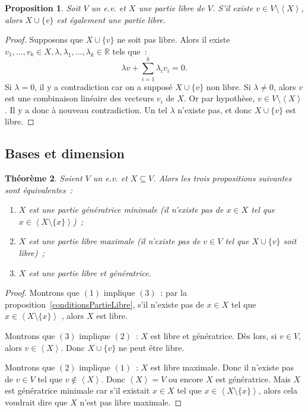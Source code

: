 \documentclass{article}
\newcommand{\R}{\mathbb R}
\newcommand{\eng}[1]{\left\langle#1\right\rangle}
\newtheorem{thm}{Théorème}[section]
\newtheorem{prp}[thm]{Proposition}
\theoremstyle{definition}
\theoremstyle{remark}
\begin{document}
		\begin{prp}\label{ajoutPartieLibre} Soit $V$ un e.v. et $X$ une partie libre de $V$. S'il existe $v \in V \setminus \eng X$, alors $X \cup \{v\}$ est
		également une partie libre. \end{prp}

		\begin{proof} Supposons que $X \cup \{v\}$ ne soit pas libre. Alors il existe $v_1, \dotsc, v_k \in X, \lambda, \lambda_1, \dotsc, \lambda_k \in \R$ tels que~:
		\[\lambda v + \sum_{i=1}^k\lambda_iv_i = 0.\] Si $\lambda = 0$, il y a contradiction car on a supposé $X \cup \{v\}$ non libre. Si $\lambda \neq 0$, alors $v$
		est une combinaison linéaire des vecteurs $v_i$ de $X$. Or par hypothèse, $v \in V \setminus \eng X$. Il y a donc à nouveau contradiction. Un tel $\lambda$
		n'existe pas, et donc $X \cup \{v\}$ est libre. \end{proof}

	\subsection{Bases et dimension}
		\begin{thm}\label{equivBases} Soient $V$ un e.v. et $X \subseteq V$. Alors les trois propositions suivantes sont équivalentes~:
		\begin{enumerate}
			\item $X$ est une partie génératrice minimale (il n'existe pas de $x \in X$ tel que $x \in \eng {X \setminus \{x\}}$)~;
			\item $X$ est une partie libre maximale (il n'existe pas de $v \in V$ tel que $X \cup \{v\}$ soit libre)~;
			\item $X$ est une partie libre et génératrice.
		\end{enumerate}
		\end{thm}

		\begin{proof} Montrons que $(1)$ implique $(3)$~: par la proposition~\ref{conditionsPartieLibre}, s'il n'existe pas de $x \in X$ tel que
		$x \in \eng {X \setminus \{x\}}$ , alors $X$ est libre.

		Montrons que $(3)$ implique $(2)$~: $X$ est libre et génératrice. Dès lors, si $v \in V$, alors $v \in \eng X$. Donc $X \cup \{v\}$ ne peut être libre.

		Montrons que $(2)$ implique $(1)$~: $X$ est libre maximale. Donc il n'existe pas de $v \in V$ tel que $v \not \in \eng X$. Donc $\eng X = V$ ou encore $X$ est
		génératrice. Mais $X$ est génératrice minimale car s'il existait $x \in X$ tel que $x \in \eng {X \setminus \{x\}}$, alors cela voudrait dire que $X$ n'est
		pas libre maximale. \end{proof}
\end{document}
